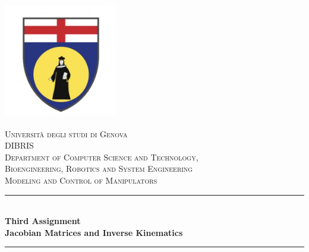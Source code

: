 \begin{titlepage}

\newcommand{\HRule}{\rule{\linewidth}{0.5mm}} %

\center
\includegraphics[width=5cm]{Title/Unige-logo.jpeg}\\[1cm] %
 

\center %


\textsc{\Huge Università degli studi di Genova}\\[1cm] %
\textsc{\LARGE DIBRIS}\\[0.3cm]
\textsc{ Department of Computer Science and Technology,}\\
\textsc{ Bioengineering, Robotics and System Engineering}\\[1cm] %
\textsc{\LARGE{Modeling and Control of Manipulators}}\\[1cm] %

\makeatletter
\HRule \\[0.4cm]
{ \huge \bfseries Third Assignment}\\[0.2cm] 
{\Large \bfseries Jacobian Matrices and Inverse Kinematics}\\
\HRule \\[1.5cm]
 

\end{titlepage}
